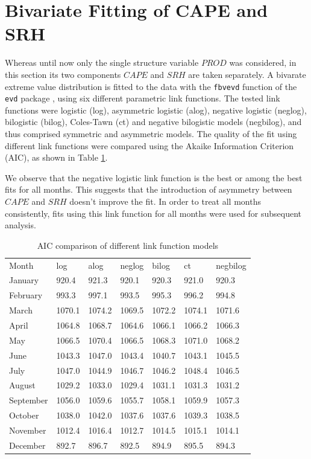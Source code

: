 \documentclass[10pt,conference,compsocconf]{IEEEtran}
\begin{document}
\section*{Bivariate Fitting of CAPE and SRH}
Whereas until now only the single structure variable $PROD$ was considered, in this section its two components $CAPE$ and $SRH$ are taken separately. A bivarate extreme value distribution is  fitted to the data with the \texttt{fbvevd} function of the \texttt{evd} package \cite{evd}, using six different parametric link functions. The tested link functions were logistic (log), asymmetric logistic (alog), negative logistic (neglog), bilogistic (bilog), Coles-Tawn (ct) and negative bilogistic models (negbilog), and thus comprised symmetric and asymmetric models. The quality of the fit using different link functions were compared using the Akaike Information Criterion (AIC), as shown in Table \ref{table:cape_srh_AIC}.
\par
We observe that the negative logistic link function is the best or among the best fits for all months. This suggests that the introduction of asymmetry between $CAPE$ and $SRH$ doesn't improve the fit. In order to treat all months consistently, fits using this link function for all months were used for subsequent analysis. 
\begin{table}[]
\begin{tabular}{lllllll}
Month     & log       & alog      & neglog    & bilog     & ct        & negbilog  \\
January   & 920.4  & 921.3  & 920.1  & 920.3  & 921.0  & 920.3  \\
February  & 993.3  & 997.1  & 993.5  & 995.3  & 996.2  & 994.8  \\
March     & 1070.1 & 1074.2 & 1069.5 & 1072.2 & 1074.1 & 1071.6 \\
April     & 1064.8 & 1068.7 & 1064.6 & 1066.1 & 1066.2 & 1066.3 \\
May       & 1066.5 & 1070.4 & 1066.5 & 1068.3 & 1071.0 & 1068.2 \\
June      & 1043.3 & 1047.0 & 1043.4 & 1040.7 & 1043.1 & 1045.5 \\
July      & 1047.0 & 1044.9 & 1046.7 & 1046.2 & 1048.4 & 1046.5 \\
August    & 1029.2 & 1033.0 & 1029.4 & 1031.1 & 1031.3 & 1031.2 \\
September & 1056.0 & 1059.6 & 1055.7 & 1058.1 & 1059.9 & 1057.3 \\
October   & 1038.0 & 1042.0 & 1037.6 & 1037.6 & 1039.3 & 1038.5 \\
November  & 1012.4 & 1016.4 & 1012.7 & 1014.5 & 1015.1 & 1014.1 \\
December  & 892.7  & 896.7  & 892.5  & 894.9  & 895.5  & 894.3
\end{tabular}
\caption{AIC comparison of different link function models}
\label{table:cape_srh_AIC}
\end{table}
\end{document}
